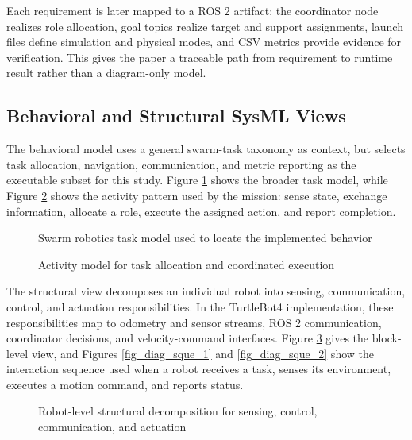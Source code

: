 \documentclass{ieeeaccess}
\begin{document}
Each requirement is later mapped to a ROS 2 artifact: the coordinator node realizes role allocation, goal topics realize target and support assignments, launch files define simulation and physical modes, and CSV metrics provide evidence for verification. This gives the paper a traceable path from requirement to runtime result rather than a diagram-only model.

\subsection{Behavioral and Structural SysML Views}
The behavioral model uses a general swarm-task taxonomy as context, but selects task allocation, navigation, communication, and metric reporting as the executable subset for this study. Figure \ref{fig_SwarmRoboticsTasks} shows the broader task model, while Figure \ref{fig_Activity_Diagram} shows the activity pattern used by the mission: sense state, exchange information, allocate a role, execute the assigned action, and report completion.

\begin{figure}[H]
  \centering
  
  \caption{Swarm robotics task model used to locate the implemented behavior}
  \label{fig_SwarmRoboticsTasks}
\end{figure}

\begin{figure}[htbp]
  \centering
  
  \caption{Activity model for task allocation and coordinated execution}
  \label{fig_Activity_Diagram}
\end{figure}

The structural view decomposes an individual robot into sensing, communication, control, and actuation responsibilities. In the TurtleBot4 implementation, these responsibilities map to odometry and sensor streams, ROS 2 communication, coordinator decisions, and velocity-command interfaces. Figure \ref{fig_DetailRobot} gives the block-level view, and Figures \ref{fig_diag_sque_1} and \ref{fig_diag_sque_2} show the interaction sequence used when a robot receives a task, senses its environment, executes a motion command, and reports status.

\begin{figure}[htbp]
  \centering
  
  \caption{Robot-level structural decomposition for sensing, control, communication, and actuation}
  \label{fig_DetailRobot}
\end{figure}
\end{document}
